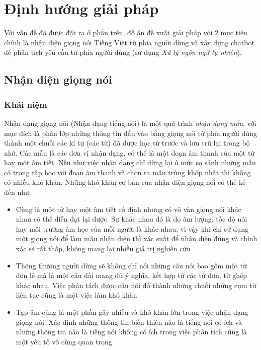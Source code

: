 \documentclass[12pt]{report}
\begin{document}
\chapter{Định hướng giải pháp}

Với vấn đề đã được đặt ra ở phần trên, đồ án đề xuất giải pháp với 2 mục tiêu chính là nhận diện giọng nói Tiếng Việt từ phía người dùng và xây dựng chatbot để phân tích yêu cầu từ phía người dùng (sử dụng \textit{Xử lý ngôn ngữ tự nhiên}).

\section{Nhận diện giọng nói}
\subsection{Khái niệm}
Nhận dạng giọng nói (Nhận dạng tiếng nói) là một quá trình \textit{nhận dạng mẫu}, với mục đích là phân lớp những thông tin đầu vào bằng giọng nói từ phía người dùng thành một chuỗi các kí tự (các từ) đã được học từ trước và lưu trữ lại trong bộ nhớ. Các mẫu là các đơn vị nhận dạng, có thể là một đoạn âm thanh của một từ hay một âm tiết. Nếu như việc nhận dạng chỉ dừng lại ở mức so sánh những mẫu có trong tập học với đoạn âm thanh và chọn ra mẫu trùng khớp nhất thì không có nhiều khó khăn. Những khó khăn cơ bản của nhận diện giọng nói có thể kể đến như:

\begin{itemize}
	\item Cùng là một từ hay một âm tiết cố định nhưng có vô vàn giọng nói khác nhau có thể diễn đạt lại được. Sự khác nhau đó là do âm lượng, tốc độ nói hay môi trường âm học của mỗi người là khác nhau, vì vậy khi chỉ sử dụng một giọng nói để làm mẫu nhận diện thì xác suất để nhận diện đúng và chính xác sẽ rất thấp, không mang lại nhiều giá trị nghiên cứu
	\item Thông thường người dùng sẽ không chỉ nói những câu nói bao gồm một từ đơn lẻ mà là một câu dài mang đủ ý nghĩa, kết hợp từ các từ đơn, từ ghép khác nhau. Việc phân tách được câu nói đó thành những chuỗi những cụm từ liên tục cũng là một việc làm khó khăn
	\item Tạp âm cũng là một phần gây nhiễu và khó khăn lớn trong việc nhận dạng giọng nói. Xác định những thông tin biến thiên nào là tiếng nói có ích và những thông tin nào là tiếng nói không có ích trong việc phân tích cũng là một yếu tố vô cùng quan trọng
\end{itemize}
\end{document}
